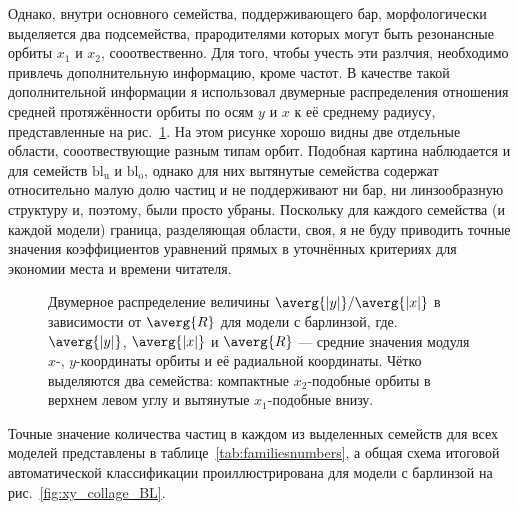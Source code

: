 \documentclass[tikz]{trlnotes}
\begin{document}
Однако, внутри основного семейства, поддерживающего бар, морфологически выделяется два подсемейства,
прародителями которых могут быть резонансные орбиты $x_1$ и $x_2$, сооотвественно. Для того, чтобы учесть
эти разлчия, необходимо привлечь дополнительную информацию, кроме частот.
В качестве такой дополнительной информации я использовал двумерные распределения отношения средней протяжённости
орбиты по осям $y$ и $x$ к её среднему радиусу, представленные на рис.~\ref{fig:x1x2sep}. На этом рисунке хорошо видны две отдельные области, сооотвествующие разным типам орбит. Подобная картина наблюдается и для семейств
$\text{bl}_\text{u}$ и $\text{bl}_\text{o}$, однако для них вытянутые семейства содержат относительно малую долю частиц и не поддерживают ни бар, ни линзообразную структуру и, поэтому, были просто убраны. 
Поскольку для каждого семейства (и каждой модели) граница, разделяющая области, своя, я не буду приводить точные значения коэффициентов уравнений прямых в
уточнённых критериях для экономии места и времени читателя.  

\begin{figure}[htpb]
  \centering
\caption{Двумерное распределение величины $\averg{|y|}/\averg{|x|}$ в зависимости от $\averg{R}$ для модели с барлинзой, где. $\averg{|y|}$, $\averg{|x|}$ и  $\averg{R}$ --- средние значения модуля $x$-, $y$-координаты орбиты и её радиальной координаты. Чётко выделяются
два семейства: компактные $x_2$-подобные орбиты в верхнем левом углу и вытянутые $x_1$-подобные внизу.}%
\label{fig:x1x2sep}
\end{figure}

Точные значение количества частиц в каждом из выделенных семейств для всех моделей представлены в таблице~\ref{tab:familiesnumbers},
а общая схема итоговой автоматической классификации проиллюстрирована для модели с барлинзой на рис.~\ref{fig:xy_collage_BL}.
\end{document}
